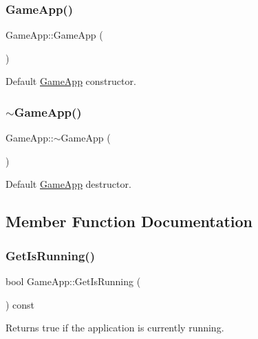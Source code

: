 \subsubsection{\texorpdfstring{Game\+App()}{GameApp()}}
{\footnotesize\ttfamily Game\+App\+::\+Game\+App (\begin{DoxyParamCaption}{ }\end{DoxyParamCaption})}

Default \mbox{\hyperlink{class_game_app}{Game\+App}} constructor. \mbox{\label{class_game_app_ae23ced12f4a79184b3719b3905c58170}} 
\subsubsection{\texorpdfstring{$\sim$\+Game\+App()}{~GameApp()}}
{\footnotesize\ttfamily Game\+App\+::$\sim$\+Game\+App (\begin{DoxyParamCaption}{ }\end{DoxyParamCaption})}

Default \mbox{\hyperlink{class_game_app}{Game\+App}} destructor. 

\subsection{Member Function Documentation}
\mbox{\label{class_game_app_aabc1e7e91c577c681c1ef8e45b926286}} 
\subsubsection{\texorpdfstring{Get\+Is\+Running()}{GetIsRunning()}}
{\footnotesize\ttfamily bool Game\+App\+::\+Get\+Is\+Running (\begin{DoxyParamCaption}{ }\end{DoxyParamCaption}) const\hspace{0.3cm}{\ttfamily [inline]}}

Returns true if the application is currently running. \mbox{\label{class_game_app_a08fc92ae5300a57c05f7bafefa53b82e}} 
